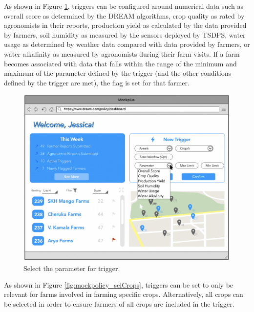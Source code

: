 \noindent
As shown in Figure \ref{fig:mockpolicy_selParam}, triggers can be configured around numerical data such as overall score as determined by the DREAM algorithms, crop quality as rated by agronomists in their reports, production yield as calculated by the data provided by farmers, soil humidity as measured by the sensors deployed by TSDPS, water usage as determined by weather data compared with data provided by farmers, or water alkalinity as measured by agronomists during their farm visits. If a farm becomes associated with data that falls within the range of the minimum and maximum of the parameter defined by the trigger (and the other conditions defined by the trigger are met), the flag is set for that farmer. 


\begin{figure}[H]
\centering
\includegraphics[scale=0.35]{../images_diagrams/mock_ups/dd/Trig03_Parameters.png}
\caption{\label{fig:mockpolicy_selParam}Select the parameter for trigger.}
\end{figure}

\noindent
As shown in Figure \ref{fig:mockpolicy_selCrops}, triggers can be set to only be relevant for farms involved in farming specific crops. Alternatively, all crops can be selected in order to ensure farmers of all crops are included in the trigger. 

